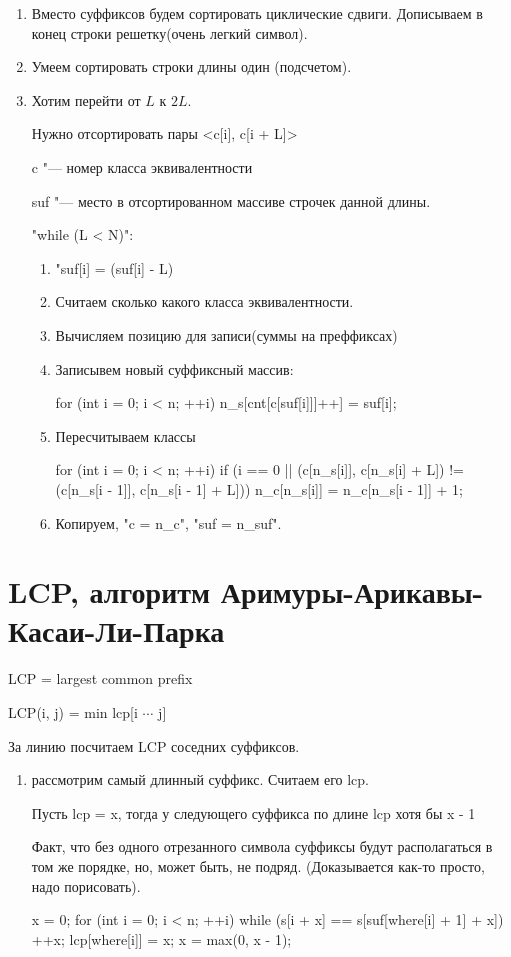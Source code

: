\begin{enumerate}
\item Вместо суффиксов будем сортировать циклические сдвиги. Дописываем в конец строки решетку(очень легкий символ).
\item Умеем сортировать строки длины один (подсчетом).
\item Хотим перейти от $L$ к $2L$.

Нужно отсортировать пары <c[i], c[i + L]>

c "--- номер класса эквивалентности

suf "--- место в отсортированном массиве строчек данной длины.

\cpp"while (L < N)":
\begin{enumerate}
    \item \cpp"suf[i] = (suf[i] - L)%
    \item Считаем сколько какого класса эквивалентности. 
    \item Вычисляем позицию для записи(суммы на преффиксах)
    \item Записывем новый суффиксный массив:
    \begin{cppcode}
        for (int i = 0; i < n; ++i) {
            n_s[cnt[c[suf[i]]]++] = suf[i];
        }
    \end{cppcode}
    \item Пересчитываем классы
    \begin{cppcode}
    for (int i = 0; i < n; ++i) {
        if (i == 0 || (c[n_s[i]], c[n_s[i] + L]) != 
                      (c[n_s[i - 1]], c[n_s[i - 1] + L])) {
            n_c[n_s[i]] = n_c[n_s[i - 1]] + 1;
        }
    }
    \end{cppcode}
    \item Копируем, \cpp"c = n_c", \cpp"suf = n_suf".
\end{enumerate}

\end{enumerate}

\section{LCP, алгоритм Аримуры-Арикавы-Касаи-Ли-Парка}
LCP = largest common prefix

LCP(i, j) = min lcp[i $\cdots$ j]

За линию посчитаем LCP соседних суффиксов. 

\begin{enumerate}
\item рассмотрим самый длинный суффикс. Считаем его lcp. 

Пусть lcp = x, тогда у следующего суффикса по длине lcp хотя бы x - 1

Факт, что без одного отрезанного символа суффиксы будут располагаться в том же порядке, но, может быть, не подряд. 
(Доказывается как-то просто, надо порисовать).


\begin{cppcode}
x = 0;
for (int i = 0; i < n; ++i) {
    while (s[i + x] == s[suf[where[i] + 1] + x]) ++x;
    lcp[where[i]] = x;
    x = max(0, x - 1);
}
\end{cppcode}
\end{enumerate}                                  
